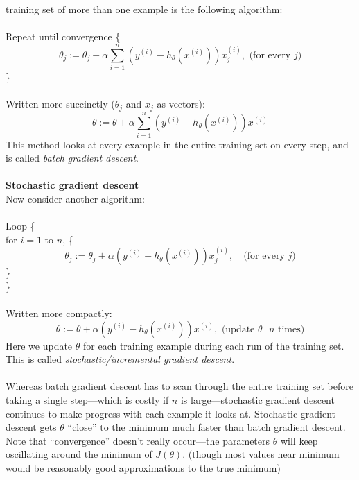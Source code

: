\documentclass{report}
\begin{document}
training set of more than one example is the following algorithm:\\
\vspace{1mm}\\
\indent Repeat until convergence \{
\begin{equation*}
\theta_j:=\theta_j+\alpha\sum^n_{i=1}\left(y^{(i)}-h_\theta(x^{(i)})\right)x_j^{(i)},\text{ (for every $j$)}
\end{equation*}
\indent\}\\
\vspace{1mm}\\
Written more succinctly ($\theta_j$ and $x_j$ as vectors):
\begin{equation*}
\theta:=\theta+\alpha\sum^n_{i=1}\left(y^{(i)}-h_\theta(x^{(i)})\right)x^{(i)}
\end{equation*}
This method looks at every example in the entire training set on every step, and is called 
\textit{batch gradient descent}.\\
\vspace{1mm}\\
\textbf{Stochastic gradient descent}\\
Now consider another algorithm:\\
\vspace{1mm}\\
\indent Loop \{\\
\indent\indent for $i=1$ to $n$, \{
\begin{equation*}
\theta_j:=\theta_j+\alpha\left(y^{(i)}-h_\theta(x^{(i)})\right)x_j^{(i)},\quad\text{(for every $j$)}
\end{equation*}
\indent\indent\}\\
\indent\}\\
\vspace{1mm}\\
Written more compactly:
\begin{equation*}
\theta:=\theta+\alpha\left(y^{(i)}-h_\theta(x^{(i)})\right)x^{(i)},\text{ (update $\theta$ $n$ times)}
\end{equation*}
Here we update $\theta$ for each training example during each run of the training set. This is called
\textit{stochastic/incremental gradient descent}.\\
\vspace{1mm}\\
Whereas batch gradient descent has to scan through the entire training set before taking a single step---which 
is costly if $n$ is large---stochastic gradient descent continues to make progress with each example it looks at.
Stochastic gradient descent gets $\theta$ ``close'' to the minimum much faster than batch gradient descent. Note
that ``convergence'' doesn't really occur---the parameters $\theta$ will keep oscillating around the minimum of
$J(\theta)$. (though most values near minimum would be reasonably good approximations to the true minimum)
\newpage
\end{document}
